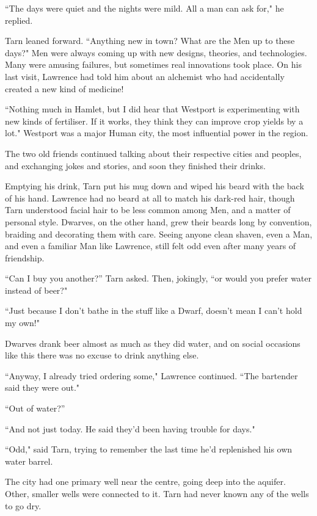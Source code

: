 ``The days were quiet and the nights were mild.  All a man can ask for," he replied.


Tarn leaned forward.  ``Anything new in town?  What are the Men up to these days?"  Men were always coming up with new designs, theories, and technologies.  Many were amusing failures, but sometimes real innovations took place.  On his last visit, Lawrence had told him about an alchemist who had accidentally created a new kind of medicine!

``Nothing much in Hamlet, but I did hear that Westport is experimenting with new kinds of fertiliser.  If it works, they think they can improve crop yields by a lot."  Westport was a major Human city, the most influential power in the region.

The two old friends continued talking about their respective cities and peoples, and exchanging jokes and stories, and soon they finished their drinks.

Emptying his drink, Tarn put his mug down and wiped his beard with the back of his hand.  Lawrence had no beard at all to match his dark-red hair, though Tarn understood facial hair to be less common among Men, and a matter of personal style.  Dwarves, on the other hand, grew their beards long by convention, braiding and decorating them with care.  Seeing anyone clean shaven, even a Man, and even a familiar Man like Lawrence, still felt odd even after many years of friendship.

``Can I buy you another?'' Tarn asked.  Then, jokingly, ``or would you prefer water instead of beer?"

``Just because I don't bathe in the stuff like a Dwarf, doesn't mean I can't hold my own!"

Dwarves drank beer almost as much as they did water, and on social occasions like this there was no excuse to drink anything else.

``Anyway, I already tried ordering some," Lawrence continued.  ``The bartender said they were out."

``Out of water?''

``And not just today.  He said they'd been having trouble for days."

``Odd," said Tarn, trying to remember the last time he'd replenished his own water barrel.

The city had one primary well near the centre, going deep into the aquifer.  Other, smaller wells were connected to it.  Tarn had never known any of the wells to go dry.

